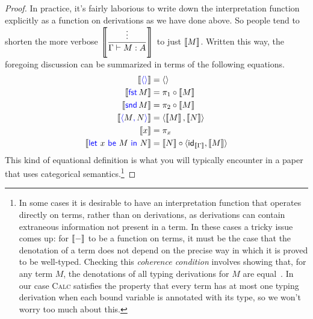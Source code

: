 \begin{proof}
  In practice, it's fairly laborious to write down
  the interpretation function explicitly as a function
  on derivations as we have done above.
  So people tend to shorten the more verbose
  \(\left\llbracket \dfrac{\vdots}{\Gamma\vdash M : A}\right\rrbracket\)
  to just
  \(\left\llbracket M\right\rrbracket\). Written this way, the foregoing discussion
  can be summarized in terms of the following
  equations.
  \begin{align*}
    \llbr{\plunit} &= \angled{} \\
    \llbr{\plfst{M}} &= \pi_1 \circ \llbr{M} \\
    \llbr{\plsnd{M}} &= \pi_2 \circ \llbr{M} \\
    \llbr{\plpair{M}{N}} &= \angled{\llbr{M},\llbr{N}} \\
    \llbr{x} &= \pi_x \\
    \llbr{\pllet{x}{M}{N}} &=
      \llbr{N} \circ \angled{\idt_{\llbr{\Gamma}},\llbr{M}}
  \end{align*}
  This kind of equational definition is what you will typically encounter in a paper
  that uses categorical semantics.\footnote{%
  In some cases it is desirable
  to have an interpretation function that operates
  directly on terms,
  rather than on derivations,
  as derivations can contain extraneous information
  not present in a term.
  In these cases a tricky issue comes up:
  for \(\left\llbracket -\right\rrbracket\) to be a function on terms,
  it must be the case that
  the denotation of a term does not depend on
  the precise way in which it is proved to be well-typed.
  Checking this \emph{coherence condition}
  involves showing that, for any term \(M\),
  the denotations of all typing derivations
  for \(M\) are equal~\citep{reynolds1991coherence}.
  In our case \textsc{Calc} satisfies the property that every term has at most one typing derivation
  when each bound variable is annotated with its type,
  so we won't worry too much about this.
}


\end{proof}
